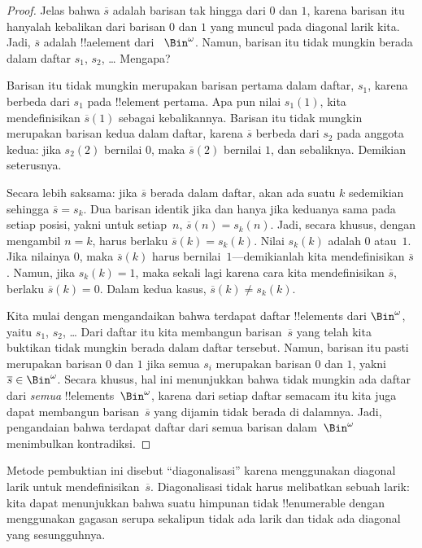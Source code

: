 \documentclass[../../../include/open-logic-section]{subfiles}
\begin{document}
\begin{proof}
Jelas bahwa $\overline{s}$ adalah barisan tak hingga dari $0$ dan $1$, karena
barisan itu hanyalah kebalikan dari barisan $0$ dan $1$ yang muncul pada
diagonal larik kita. Jadi, $\overline{s}$ adalah !!a{element} dari
~$\Bin^\omega$. Namun, barisan itu tidak mungkin berada dalam daftar $s_1$,
$s_2$, \dots{} Mengapa?

Barisan itu tidak mungkin merupakan barisan pertama dalam daftar, $s_1$,
karena berbeda dari $s_1$ pada !!{element} pertama. Apa pun nilai $s_1(1)$,
kita mendefinisikan $\overline{s}(1)$ sebagai kebalikannya. Barisan itu tidak
mungkin merupakan barisan kedua dalam daftar, karena $\overline{s}$ berbeda
dari $s_2$ pada anggota kedua: jika $s_2(2)$ bernilai $0$, maka
$\overline{s}(2)$ bernilai $1$, dan sebaliknya. Demikian seterusnya.

Secara lebih saksama: jika $\overline{s}$ berada dalam daftar, akan ada suatu
$k$ sedemikian sehingga $\overline{s} = s_{k}$. Dua barisan identik jika dan
hanya jika keduanya sama pada setiap posisi, yakni untuk setiap~$n$,
$\overline{s}(n) = s_{k}(n)$. Jadi, secara khusus, dengan mengambil $n = k$,
harus berlaku $\overline{s}(k) = s_{k}(k)$. Nilai $s_k(k)$ adalah $0$ atau~$1$.
Jika nilainya $0$, maka $\overline{s}(k)$ harus bernilai~$1$---demikianlah
kita mendefinisikan $\overline{s}$. Namun, jika $s_k(k) = 1$, maka sekali lagi
karena cara kita mendefinisikan $\overline{s}$, berlaku $\overline{s}(k) = 0$.
Dalam kedua kasus, $\overline{s}(k) \neq s_{k}(k)$.

Kita mulai dengan mengandaikan bahwa terdapat daftar !!{element}s dari
$\Bin^\omega$, yaitu $s_1$, $s_2$, \dots{} Dari daftar itu kita membangun
barisan~$\overline{s}$ yang telah kita buktikan tidak mungkin berada dalam
daftar tersebut. Namun, barisan itu pasti merupakan barisan $0$ dan $1$ jika
semua $s_i$ merupakan barisan $0$ dan $1$, yakni $\overline{s} \in
\Bin^\omega$. Secara khusus, hal ini menunjukkan bahwa tidak mungkin ada
daftar dari \emph{semua} !!{element}s~$\Bin^\omega$, karena dari setiap daftar
semacam itu kita juga dapat membangun barisan~$\overline{s}$ yang dijamin
tidak berada di dalamnya. Jadi, pengandaian bahwa terdapat daftar dari semua
barisan dalam~$\Bin^\omega$ menimbulkan kontradiksi.
\end{proof}

\begin{explain}
Metode pembuktian ini disebut ``diagonalisasi'' karena menggunakan diagonal
larik untuk mendefinisikan~$\overline{s}$. Diagonalisasi tidak harus melibatkan
sebuah larik: kita dapat menunjukkan bahwa suatu himpunan tidak
!!{enumerable} dengan menggunakan gagasan serupa sekalipun tidak ada larik
dan tidak ada diagonal yang sesungguhnya.
\end{explain}
\end{document}
